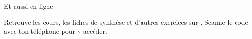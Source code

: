 \vspace{8mm}
\begin{tcolorbox}[colback=otNavyTint,colframe=otNavyTint,boxrule=0pt,arc=2mm,
  left=5mm,right=5mm,top=4mm,bottom=4mm]
\begin{minipage}[c]{24mm}
{\color{otNavy}\qrcode[height=21mm,nolink]{\otURL}}
\end{minipage}\hspace{5mm}%
\begin{minipage}[c]{120mm}
{\otSemi\fontsize{11}{14}\selectfont\color{otNavy}Et aussi en ligne}\par\vspace{1.5mm}
{\fontsize{10}{13.5}\selectfont Retrouve les cours, les fiches de synthèse et d'autres
exercices sur \textbf{\otSite}. Scanne le code avec ton téléphone pour y accéder.}
\end{minipage}
\end{tcolorbox}
\clearpage
